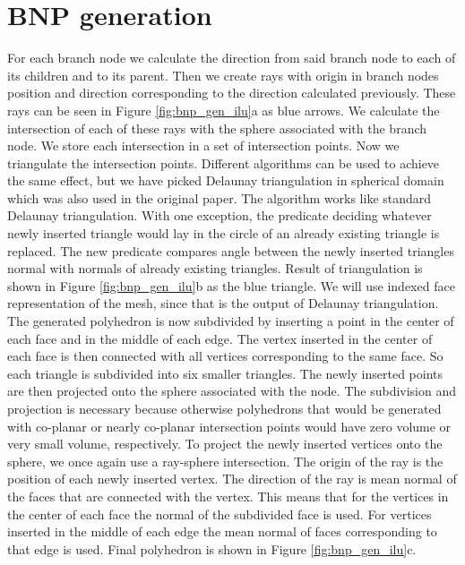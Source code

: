 \section{BNP generation}\label{sec:bnp_gen}
For each branch node we calculate the direction from said branch node to each of its children and to its parent. Then we create rays with origin in branch nodes position and direction corresponding to the direction calculated previously. These rays can be seen in Figure \ref{fig:bnp_gen_ilu}a as blue arrows. We calculate the intersection of each of these rays with the sphere associated with the branch node. We store each intersection in a set of intersection points. Now we triangulate the intersection points. Different algorithms can be used to achieve the same effect, but we have picked Delaunay triangulation in spherical domain which was also used in the original paper. The algorithm works like standard Delaunay triangulation. With one exception, the predicate deciding whatever newly inserted triangle would lay in the circle of an already existing triangle is replaced. The new predicate compares angle between the newly inserted triangles normal with normals of already existing triangles. Result of triangulation is shown in Figure \ref{fig:bnp_gen_ilu}b as the blue triangle. We will use indexed face representation of the mesh, since that is the output of Delaunay triangulation. The generated polyhedron is now subdivided by inserting a point in the center of each face and in the middle of each edge. The vertex inserted in the center of each face is then connected with all vertices corresponding to the same face. So each triangle is subdivided into six smaller triangles. The newly inserted points are then projected onto the sphere associated with the node. The subdivision and projection is necessary because otherwise polyhedrons that would be generated with co-planar or nearly co-planar intersection points would have zero volume or very small volume, respectively. To project the newly inserted vertices onto the sphere, we once again use a ray-sphere intersection. The origin of the ray is the position of each newly inserted vertex. The direction of the ray is mean normal of the faces that are connected with the vertex. This means that for the vertices in the center of each face the normal of the subdivided face is used. For vertices inserted in the middle of each edge the mean normal of faces corresponding to that edge is used. Final polyhedron is shown in Figure \ref{fig:bnp_gen_ilu}c.


